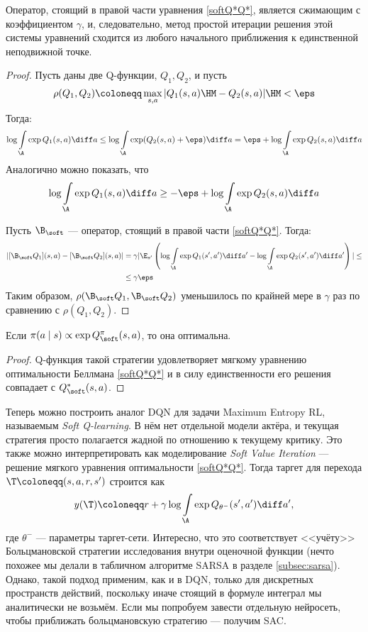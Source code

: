 \begin{theorem}
Оператор, стоящий в правой части уравнения \eqref{softQ*Q*}, является сжимающим с коэффициентом $\gamma$, и, следовательно, метод простой итерации решения этой системы уравнений сходится из любого начального приближения к единственной неподвижной точке.
\begin{proof}
Пусть даны две Q-функции, $Q_1, Q_2$, и пусть 
$$\rho(Q_1, Q_2) \coloneqq \max\limits_{s, a} | Q_1(s, a) \HM- Q_2(s, a) | \HM< \eps$$
Тогда:
$$
\log \int\limits_{\A} \exp Q_1(s, a) \diff a \le \log \int\limits_{\A} \exp (Q_2(s, a) + \eps) \diff a = \eps + \log \int\limits_{\A} \exp Q_2(s, a) \diff a
$$
Аналогично можно показать, что 
$$
\log \int\limits_{\A} \exp Q_1(s, a) \diff a \ge -\eps + \log \int\limits_{\A} \exp Q_2(s, a) \diff a
$$

Пусть $\B_{\soft}$ --- оператор, стоящий в правой части \eqref{softQ*Q*}. Тогда:
\begin{align*}
| [\B_{\soft} Q_1](s, a) - [\B_{\soft} Q_2](s, a) | &= \gamma | \E_{s'} \left( \log \int\limits_{\A} \exp Q_1(s', a') \diff a' - \log \int\limits_{\A} \exp Q_2(s', a') \diff a' \right) | \le \\ 
&\le \gamma \eps
\end{align*}
Таким образом, $\rho(\B_{\soft} Q_1, \B_{\soft} Q_2)$ уменьшилось по крайней мере в $\gamma$ раз по сравнению с $\rho(Q_1, Q_2)$.
\end{proof}
\end{theorem}

\begin{proposition}
Если $\pi(a \mid s) \propto \exp Q^{\pi}_{\soft}(s, a)$, то она оптимальна.
\begin{proof}
Q-функция такой стратегии удовлетворяет мягкому уравнению оптимальности Беллмана \eqref{softQ*Q*} и в силу единственности его решения совпадает с $Q^*_{\soft}(s, a)$.
\end{proof}
\end{proposition}

Теперь можно построить аналог DQN для задачи Maximum Entropy RL, называемым \emph{Soft Q-learning}. В нём нет отдельной модели актёра, и текущая стратегия просто полагается жадной по отношению к текущему критику. Это также можно интерпретировать как моделирование \emph{Soft Value Iteration} --- решение мягкого уравнения оптимальности \eqref{softQ*Q*}. Тогда таргет для перехода $\T \coloneqq (s, a, r, s')$ строится как
$$y(\T) \coloneqq r + \gamma \log \int\limits_{\A} \exp Q_{\theta^{-}}(s', a') \diff a',$$
где $\theta^{-}$ --- параметры таргет-сети. Интересно, что это соответствует <<учёту>> Больцмановской стратегии исследования внутри оценочной функции (нечто похожее мы делали в табличном алгоритме SARSA в разделе \ref{subsec:sarsa}). Однако, такой подход применим, как и в DQN, только для дискретных пространств действий, поскольку иначе стоящий в формуле интеграл мы аналитически не возьмём. Если мы попробуем завести отдельную нейросеть, чтобы приближать больцмановскую стратегию --- получим SAC.


